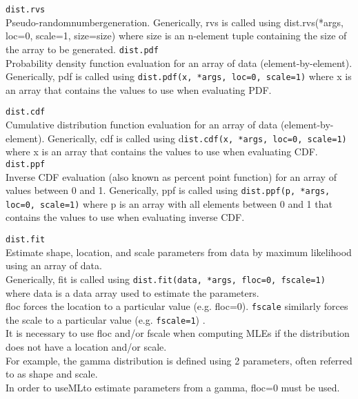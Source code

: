 \documentclass[MASTER.tex]{subfiles}
\begin{document}
 
   
   \texttt{dist.rvs}\\
  Pseudo-randomnumbergeneration. Generically, rvs is called using dist.rvs(*args, loc=0, scale=1, size=size)
  where size is an n-element tuple containing the size of the array to be generated.
   \texttt{dist.pdf}\\
  Probability density function evaluation for an array of data (element-by-element). Generically, pdf is
  called using \texttt{dist.pdf(x, *args, loc=0, scale=1)} where x is an array that contains the values to use when
  evaluating PDF.
  
 
 
  
   \texttt{dist.cdf}\\
  Cumulative distribution function evaluation for an array of data (element-by-element). Generically, cdf
  is called using d\texttt{ist.cdf(x, *args, loc=0, scale=1)} where x is an array that contains the values to use
  when evaluating CDF.
   \texttt{dist.ppf}\\
  Inverse CDF evaluation (also known as percent point function) for an array of values between 0 and 1.
  Generically, ppf is called using \texttt{dist.ppf(p, *args, loc=0, scale=1)} where p is an array with all elements
  between 0 and 1 that contains the values to use when evaluating inverse CDF.
  
 
 
  
   \texttt{dist.fit}\\
  Estimate shape, location, and scale parameters from data by maximum likelihood using an array of data.
  \\ Generically, fit is called using \texttt{dist.fit(data, *args, floc=0, fscale=1)} where data is a data array used
  to estimate the parameters. \\ floc forces the location to a particular value (e.g. floc=0). \texttt{fscale} similarly
  forces the scale to a particular value (e.g. \texttt{fscale=1}) .\\  It is necessary to use floc and/or fscale when
  computing MLEs if the distribution does not have a location and/or scale.\\ For example, the gamma distribution
  is defined using 2 parameters, often referred to as shape and scale. \\ In order to useMLto estimate
  parameters from a gamma, floc=0 must be used.
  
\end{document}
